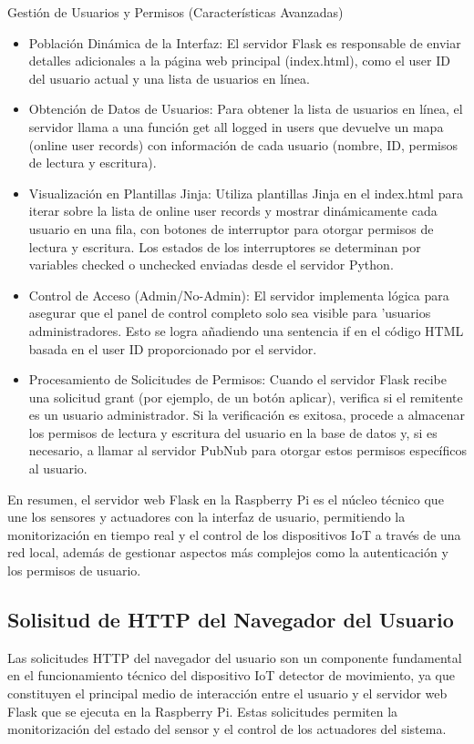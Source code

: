 \documentclass{report}
\begin{document}
Gestión de Usuarios y Permisos (Características Avanzadas)
\begin{itemize}
    \item Población Dinámica de la Interfaz: El servidor Flask es responsable de enviar detalles adicionales a la página web principal 
    (index.html), como el user ID del usuario actual y una lista de usuarios en línea.
    \item Obtención de Datos de Usuarios: Para obtener la lista de usuarios en línea, el servidor llama a una función get all logged in users 
    que devuelve un mapa (online user records) con información de cada usuario (nombre, ID, permisos de lectura y escritura).
    \item Visualización en Plantillas Jinja: Utiliza plantillas Jinja en el index.html para iterar sobre la lista de online user records 
    y mostrar dinámicamente cada usuario en una fila, con botones de interruptor para otorgar permisos de lectura y escritura. 
    Los estados de los interruptores se determinan por variables checked o unchecked enviadas desde el servidor Python.
    \item Control de Acceso (Admin/No-Admin): El servidor implementa lógica para asegurar que el panel de control completo solo sea 
    visible para  'usuarios administradores. Esto se logra añadiendo una sentencia if en el código HTML basada en el
     user ID proporcionado por el servidor.
    \item Procesamiento de Solicitudes de Permisos: Cuando el servidor Flask recibe una solicitud grant (por ejemplo, de un botón aplicar), 
    verifica si el remitente es un usuario administrador. Si la verificación es exitosa, procede a almacenar los permisos de lectura y 
    escritura del usuario en la base de datos y, si es necesario, a llamar al servidor PubNub para otorgar estos permisos específicos al usuario.
\end{itemize}

En resumen, el servidor web Flask en la Raspberry Pi es el núcleo técnico que une los sensores y actuadores con la interfaz de usuario, 
permitiendo la monitorización en tiempo real y el control de los dispositivos IoT a través de una red local, además de gestionar aspectos 
más complejos como la autenticación y los permisos de usuario.

\subsection{Solisitud de HTTP del Navegador del Usuario}
Las solicitudes HTTP del navegador del usuario son un componente fundamental en el funcionamiento técnico del dispositivo IoT detector de movimiento, 
ya que constituyen el principal medio de interacción entre el usuario y el servidor web Flask que se ejecuta en la Raspberry Pi. Estas solicitudes 
permiten la monitorización del estado del sensor y el control de los actuadores del sistema.
\end{document}
